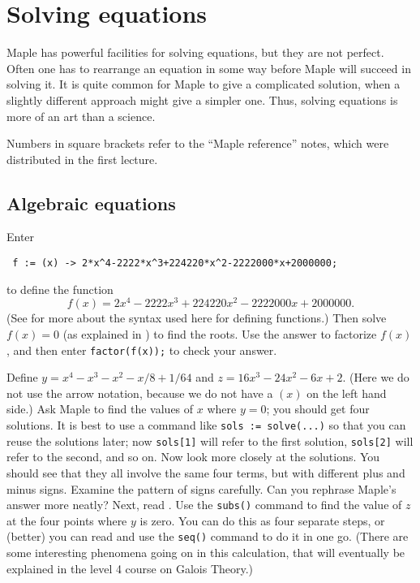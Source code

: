 \documentclass[a4paper,10pt]{amsbook}
\numberwithin{example}{chapter}
\begin{document}
\chapter{Solving equations} 

Maple has powerful facilities for solving equations, but they are not
perfect.  Often one has to rearrange an equation in some way before
Maple will succeed in solving it.  It is quite common for Maple to
give a complicated solution, when a slightly different approach might
give a simpler one.  Thus, solving equations is more of an art than a
science.  

Numbers in square brackets refer to the ``Maple
reference'' notes, which were distributed in the first lecture.

\section{Algebraic equations}

\begin{exercise}\label{ex-decimal-roots}
 Enter
\begin{verbatim}
 f := (x) -> 2*x^4-2222*x^3+224220*x^2-2222000*x+2000000;
\end{verbatim}
 to define the function
 \[ f(x) = 2x^4-2222x^3+224220x^2-2222000x+2000000. \]
 (See \note{\NOTEarrow -- \NOTEshowfuncdef} for more about
 the syntax used here for defining functions.) Then solve 
 $f(x)=0$ (as explained in \note{\NOTEsolve})
 to find the roots.  Use the answer to factorize $f(x)$, and then
 enter \verb~factor(f(x));~ to check your answer.
\end{exercise}

\begin{exercise}\label{ex-biquadratic-roots}
  Define $y=x^4-x^3-x^2-x/8+1/64$ and $z=16x^3-24x^2-6x+2$.  (Here we
  do not use the arrow notation, because we do not have a $(x)$ on the
  left hand side.)  Ask Maple to find the values of $x$ where $y=0$;
  you should get four solutions.  It is best to use a command like
  \verb~sols := solve(...)~ so that you can reuse the solutions later;
  now \verb~sols[1]~ will refer to the first solution, \verb~sols[2]~
  will refer to the second, and so on.  Now look more closely at the
  solutions.  You should see that they all involve the same four
  terms, but with different plus and minus signs.  Examine the pattern
  of signs carefully.  Can you rephrase Maple's answer more neatly?
  Next, read \note{\NOTEsubs -- \NOTEsolvesubs}.  Use the
  \verb~subs()~ command to find the value of $z$ at the four points
  where $y$ is zero.  You can do this as four separate steps, or
  (better) you can read \note{\NOTEseq} and use the \verb~seq()~
  command to do it in one go.  (There are some interesting phenomena
  going on in this calculation, that will eventually be explained in
  the level 4 course on Galois Theory.)
\end{exercise}
\end{document}
